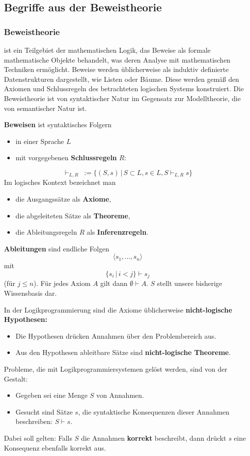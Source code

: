 \documentclass[runningheads,deutsch]{llncs}
\begin{document}
\subsection{Begriffe aus der Beweistheorie}

\subsubsection{Beweistheorie}
ist ein Teilgebiet der mathematischen Logik, das Beweise als formale mathematische Objekte behandelt, was deren Analyse mit mathematischen Techniken ermöglicht. Beweise werden üblicherweise als induktiv definierte Datenstrukturen dargestellt, wie Listen oder Bäume. Diese werden gemäß den Axiomen und Schlussregeln des betrachteten logischen Systems konstruiert. Die Beweistheorie ist von syntaktischer Natur im Gegensatz zur Modelltheorie, die von semantischer Natur ist. 

\textbf{Beweisen} ist syntaktisches Folgern
\begin{itemize}
    \item in einer Sprache $L$
    \item mit vorgegebenen \textbf{Schlussregeln} $R$:
\end{itemize}

\[ \vdash_{L,R}\; := \{(S, s) \, |\, S \subset L, s \in L, S \vdash_{L,R} s\} \]
%
Im logisches Kontext bezeichnet man
\begin{itemize}
    \item die Ausgangssätze als \textbf{Axiome},
    \item die abgeleiteten Sätze als \textbf{Theoreme},
    \item die Ableitungsregeln $R$ als \textbf{Inferenzregeln}.
\end{itemize}
%
\textbf{Ableitungen} sind endliche Folgen
\[ \langle s_1, \dots, s_n\rangle \]
mit
\[ \{s_i \, |\, i < j\} \vdash s_j \]
(für $j \leq n$).
Für jedes Axiom $A$ gilt dann $\emptyset \vdash A$. $S$ stellt unsere bisherige Wissensbasis dar.

In der Logikprogrammierung sind die Axiome üblicherweise \textbf{nicht-logische Hypothesen:}
\begin{itemize}
    \item Die Hypothesen drücken Annahmen über den Problembereich aus.
    \item Aus den Hypothesen ableitbare Sätze sind \textbf{nicht-logische Theoreme}.
\end{itemize}
%
Probleme, die mit Logikprogrammiersystemen gelöst werden, sind von der Gestalt:
\begin{itemize}
    \item Gegeben sei eine Menge $S$ von Annahmen.
    \item Gesucht sind Sätze $s$, die syntaktische Konsequenzen dieser Annahmen beschreiben: $S \vdash s$.
\end{itemize}
%
Dabei soll gelten: Falls $S$ die Annahmen \textbf{korrekt} beschreibt, dann drückt $s$ eine Konsequenz ebenfalls korrekt aus.
\end{document}
